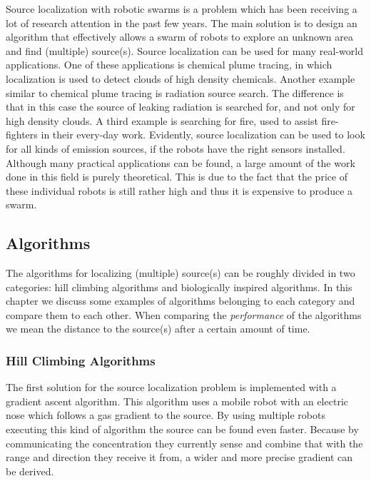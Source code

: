 
Source localization with robotic swarms is a problem which has been receiving a lot of research attention in the past few years.
The main solution is to design an algorithm that effectively allows a swarm of robots to explore an unknown area and find (multiple) source(s).
Source localization can be used for many real-world applications.
One of these applications is chemical plume tracing, in which localization is used to detect clouds of high density chemicals. \cite{zarzhitsky2005distributed}
Another example similar to chemical plume tracing is radiation source search. \cite{bashyal2008human}
The difference is that in this case the source of leaking radiation is searched for, and not only for high density clouds.
A third example is searching for fire, used to assist fire-fighters in their every-day work. \cite{marjovi2009multi}
Evidently, source localization can be used to look for all kinds of emission sources, if the robots have the right sensors installed. \cite{cui2004swarm}
Although many practical applications can be found, a large amount of the work done in this field is purely theoretical.
This is due to the fact that the price of these individual robots is still rather high and thus it is expensive to produce a swarm.

\subsection{Algorithms}
The algorithms for localizing (multiple) source(s) can be roughly divided in two categories: hill climbing algorithms and biologically inspired algorithms.
In this chapter we discuss some examples of algorithms belonging to each category and compare them to each other.
When comparing the \emph{performance} of the algorithms we mean the distance to the source(s) after a certain amount of time. 

  \subsubsection{Hill Climbing Algorithms}
    The first solution for the source localization problem is implemented with a gradient ascent algorithm.
    This algorithm uses a mobile robot with an electric nose which follows a gas gradient to the source. \cite{rozas1991artificial}
    By using multiple robots executing this kind of algorithm the source can be found even faster.
    Because by communicating the concentration they currently sense and combine that with the range and direction they receive it from, a wider and more precise gradient can be derived. \cite{sandini1993gradient}\\

